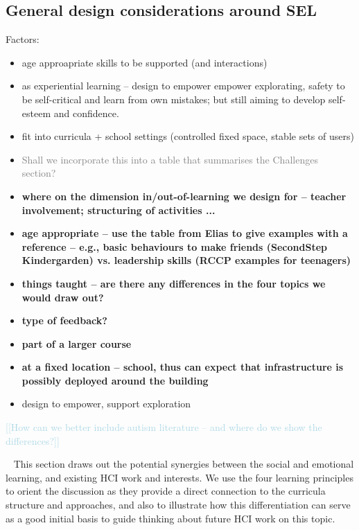 \documentclass[prodmode,acmtochi]{acmsmall}
\newcommand{\todo}[1]{\textrm{\textrm{\textcolor{LightBlue}{[[#1]]} } } }
\newcommand{\rephrase}[1]{\textrm{\textrm{\textcolor{gray}{#1}}}}
\begin{document}
\subsection{General design considerations around SEL}
Factors: 
\begin{itemize}
	\item age approapriate skills to be supported (and interactions)  
	\item as experiential learning -- design to empower empower explorating, safety to be self-critical and learn from own mistakes; but still aiming to develop self-esteem and confidence. 
	\item fit into curricula + school settings (controlled fixed space, stable sets of users)
	\item \rephrase{Shall we incorporate this into a table that summarises the Challenges section?}
\end{itemize}

\begin{itemize}
	\item {\bf where on the dimension in/out-of-learning we design for -- teacher involvement; structuring of activities ... }
	\item {\bf age appropriate -- use the table from Elias to give examples with a reference -- e.g., basic behaviours to make friends (SecondStep Kindergarden) vs. leadership skills (RCCP examples for teenagers)}
	\item {\bf things taught -- are there any differences in the four topics we would draw out?}
	\item {\bf type of feedback?}
	\item {\bf part of a larger course}
	\item {\bf at a fixed location -- school, thus can expect that infrastructure is possibly deployed around the building}
	\item design to empower, support exploration 
\end{itemize}

 \todo{How can we better include autism literature -- and where do we show the differences?}

\iffalse
\iffalse
\vfill ~ \pagebreak
This section draws out the potential synergies between the social and emotional learning, and existing HCI work and interests. We use the four learning principles to orient the discussion as they provide a direct connection to the curricula structure and approaches, and also to illustrate how this differentiation can serve as a good initial basis to guide thinking about  future HCI work on this topic. 
\end{document}
